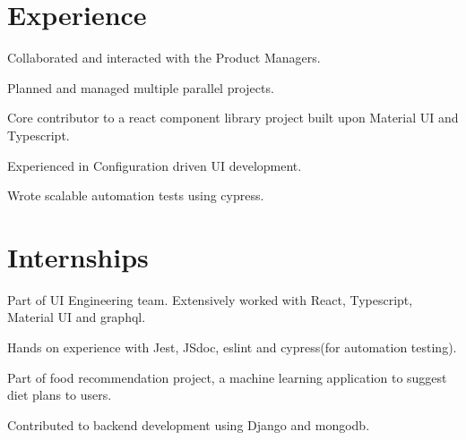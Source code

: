 \documentclass[]{manoj-resume}
\begin{document}
\hfill
\begin{minipage}[t]{0.66\textwidth} 


\section{Experience}

\vspace{\topsep} %
\begin{tightemize}
\item Collaborated and interacted with the Product Managers.
\item Planned and managed multiple parallel projects.
\item Core contributor to a react component library project built upon Material UI and Typescript.
\item Experienced in Configuration driven UI development.
\item Wrote scalable automation tests using cypress. 
\end{tightemize}
\sectionsep

\section{Internships}

\vspace{\topsep} %
\begin{tightemize}
\item Part of UI Engineering team. Extensively worked with React, Typescript, Material UI and graphql. 
\item Hands on experience with Jest, JSdoc, eslint and cypress(for automation testing).
\end{tightemize}
\sectionsep

\begin{tightemize}
\item Part of food recommendation project, a machine learning application to suggest diet plans to users.
\item Contributed to backend development using Django and mongodb.
\end{tightemize}
\sectionsep


\end{minipage}
\end{document}
